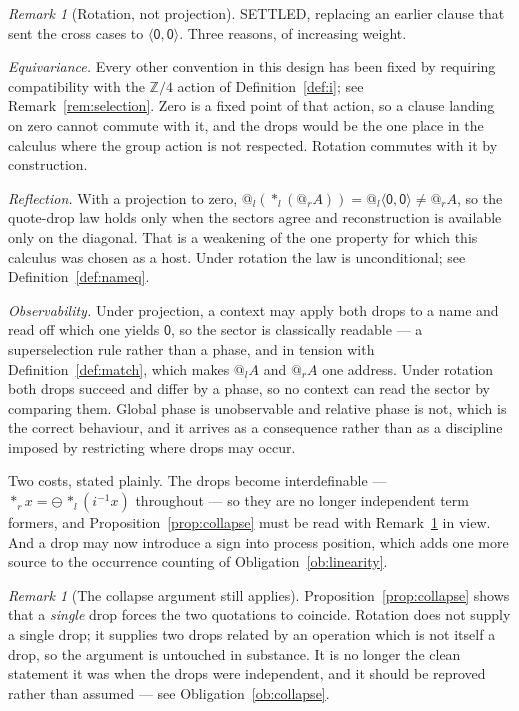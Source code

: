 \documentclass[11pt]{article}
\makeatletter
\theoremstyle{definition}
\theoremstyle{remark}
\newtheorem{remark}[theorem]{Remark}
\newcommand{\pzero}{\mathsf{0}}
\newcommand{\quo}[1]{\ensuremath{@_{#1}}}
\newcommand{\drp}[1]{\ensuremath{*_{#1}}}
\newcommand{\dip}[2]{\ensuremath{\langle #1 , #2 \rangle}}
\newcommand{\negop}{\ensuremath{\ominus}}
\makeatother
\begin{document}
\begin{remark}[Rotation, not projection]
\label{rem:rotation}
SETTLED, replacing an earlier clause that sent the cross cases to
$\dip{\pzero}{\pzero}$. Three reasons, of increasing weight.

\emph{Equivariance.} Every other convention in this design has been fixed by
requiring compatibility with the $\mathbb{Z}/4$ action of
Definition~\ref{def:i}; see Remark~\ref{rem:selection}. Zero is a fixed point of
that action, so a clause landing on zero cannot commute with it, and the drops
would be the one place in the calculus where the group action is not respected.
Rotation commutes with it by construction.

\emph{Reflection.} With a projection to zero,
$\quo{l}(\drp{l}(\quo{r}A)) = \quo{l}\dip{\pzero}{\pzero} \neq \quo{r}A$, so the
quote-drop law holds only when the sectors agree and reconstruction is available
only on the diagonal. That is a weakening of the one property for which this
calculus was chosen as a host. Under rotation the law is unconditional; see
Definition~\ref{def:nameq}.

\emph{Observability.} Under projection, a context may apply both drops to a name
and read off which one yields $\pzero$, so the sector is classically readable ---
a superselection rule rather than a phase, and in tension with
Definition~\ref{def:match}, which makes $\quo{l}A$ and $\quo{r}A$ one address.
Under rotation both drops succeed and differ by a phase, so no context can read
the sector by comparing them. Global phase is unobservable and relative phase is
not, which is the correct behaviour, and it arrives as a consequence rather than
as a discipline imposed by restricting where drops may occur.

Two costs, stated plainly. The drops become interdefinable ---
$\drp{r}x = \negop\,\drp{l}(i^{-1}x)$ throughout --- so they are no longer
independent term formers, and Proposition~\ref{prop:collapse} must be read with
Remark~\ref{rem:collapsestill} in view. And a drop may now introduce a sign into
process position, which adds one more source to the occurrence counting of
Obligation~\ref{ob:linearity}.
\end{remark}

\begin{remark}[The collapse argument still applies]
\label{rem:collapsestill}
Proposition~\ref{prop:collapse} shows that a \emph{single} drop forces the two
quotations to coincide. Rotation does not supply a single drop; it supplies two
drops related by an operation which is not itself a drop, so the argument is
untouched in substance. It is no longer the clean statement it was when the
drops were independent, and it should be reproved rather than assumed --- see
Obligation~\ref{ob:collapse}.
\end{remark}
\end{document}
